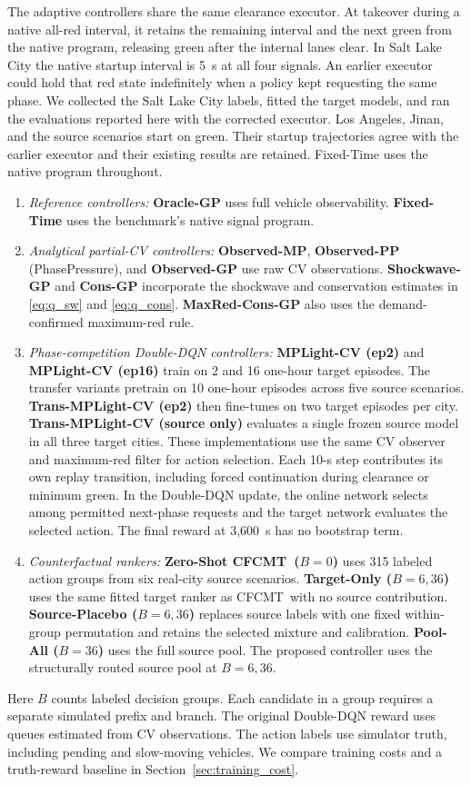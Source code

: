 \documentclass[letterpaper,journal]{IEEEtran}
\newcommand{\method}{CFCMT}
\begin{document}
The adaptive controllers share the same clearance executor. At takeover during a native all-red interval, it retains the remaining interval and the next green from the native program, releasing green after the internal lanes clear. In Salt Lake City the native startup interval is 5~s at all four signals. An earlier executor could hold that red state indefinitely when a policy kept requesting the same phase. We collected the Salt Lake City labels, fitted the target models, and ran the evaluations reported here with the corrected executor. Los Angeles, Jinan, and the source scenarios start on green. Their startup trajectories agree with the earlier executor and their existing results are retained. Fixed-Time uses the native program throughout.
\begin{enumerate}
    \item \textit{Reference controllers:} \textbf{Oracle-GP} uses full vehicle observability. \textbf{Fixed-Time} uses the benchmark's native signal program.
    \item \textit{Analytical partial-CV controllers:} \textbf{Observed-MP}, \textbf{Observed-PP} (PhasePressure), and \textbf{Observed-GP} use raw CV observations. \textbf{Shockwave-GP} and \textbf{Cons-GP} incorporate the shockwave and conservation estimates in \eqref{eq:q_sw} and \eqref{eq:q_cons}. \textbf{MaxRed-Cons-GP} also uses the demand-confirmed maximum-red rule.
    \item \textit{Phase-competition Double-DQN controllers:} \textbf{MPLight-CV (ep2)} and \textbf{MPLight-CV (ep16)} train on 2 and 16 one-hour target episodes. The transfer variants pretrain on 10 one-hour episodes across five source scenarios. \textbf{Trans-MPLight-CV (ep2)} then fine-tunes on two target episodes per city. \textbf{Trans-MPLight-CV (source only)} evaluates a single frozen source model in all three target cities. These implementations use the same CV observer and maximum-red filter for action selection. Each 10-s step contributes its own replay transition, including forced continuation during clearance or minimum green. In the Double-DQN update, the online network selects among permitted next-phase requests and the target network evaluates the selected action. The final reward at 3,600~s has no bootstrap term.
    \item \textit{Counterfactual rankers:} \textbf{Zero-Shot \method\ ($B=0$)} uses 315 labeled action groups from six real-city source scenarios. \textbf{Target-Only ($B=6,36$)} uses the same fitted target ranker as \method\ with no source contribution. \textbf{Source-Placebo ($B=6,36$)} replaces source labels with one fixed within-group permutation and retains the selected mixture and calibration. \textbf{Pool-All ($B=36$)} uses the full source pool. The proposed controller uses the structurally routed source pool at \textbf{$B=6,36$}.
\end{enumerate}
Here $B$ counts labeled decision groups. Each candidate in a group requires a separate simulated prefix and branch. The original Double-DQN reward uses queues estimated from CV observations. The action labels use simulator truth, including pending and slow-moving vehicles. We compare training costs and a truth-reward baseline in Section~\ref{sec:training_cost}.
\end{document}
